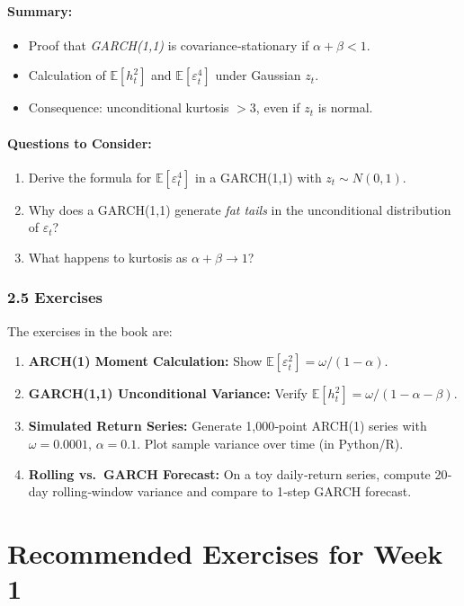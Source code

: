 \documentclass[11pt]{amsart}
\begin{document}
\paragraph{Summary:}
\begin{itemize}[noitemsep,left=0pt]
  \item Proof that \emph{GARCH(1,1)} is covariance‐stationary if $\alpha + \beta < 1$.
  \item Calculation of $\mathbb{E}[h_t^2]$ and $\mathbb{E}[\varepsilon_t^4]$ under Gaussian $z_t$.
  \item Consequence: unconditional kurtosis $> 3$, even if $z_t$ is normal.
\end{itemize}

\paragraph{Questions to Consider:}
\begin{enumerate}[noitemsep,left=0pt]
  \item Derive the formula for $\mathbb{E}[\varepsilon_t^4]$ in a GARCH(1,1) with $z_t \sim N(0,1)$.
  \item Why does a GARCH(1,1) generate \emph{fat tails} in the unconditional distribution of $\varepsilon_t$?
  \item What happens to kurtosis as $\alpha + \beta \to 1$?
\end{enumerate}

\subsubsection{2.5 Exercises}
The exercises in the book are:
\begin{enumerate}[noitemsep,left=0pt]
  \item \textbf{ARCH(1) Moment Calculation:} Show $\mathbb{E}[\varepsilon_t^2] = \omega/(1 - \alpha)$.
  \item \textbf{GARCH(1,1) Unconditional Variance:} Verify $\mathbb{E}[h_t^2] = \omega/(1 - \alpha - \beta)$.
  \item \textbf{Simulated Return Series:} Generate 1{,}000‐point ARCH(1) series with $\omega=0.0001$, $\alpha=0.1$. Plot sample variance over time (in Python/R).
  \item \textbf{Rolling vs.\ GARCH Forecast:} On a toy daily‐return series, compute 20‐day rolling‐window variance and compare to 1‐step GARCH forecast.
\end{enumerate}

\section{Recommended Exercises for Week 1}
\end{document}

